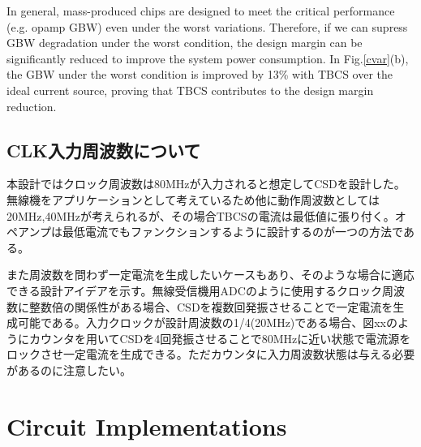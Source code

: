 \documentclass[letterpaper, 10 pt, conference]{ieeeconf}  %
\begin{document}
In general, mass-produced chips are designed to meet the critical performance (e.g. opamp GBW) even under the worst variations. Therefore, if we can supress GBW degradation under the worst condition, the design margin can be significantly reduced to improve the system power consumption. In Fig.\ref{cvar}(b), the GBW under the worst condition is improved by 13\% with TBCS over the ideal current source, proving that TBCS contributes to the design margin reduction.

\subsection{CLK入力周波数について}
本設計ではクロック周波数は80MHzが入力されると想定してCSDを設計した。無線機をアプリケーションとして考えているため他に動作周波数としては20MHz,40MHzが考えられるが、その場合TBCSの電流は最低値に張り付く。オペアンプは最低電流でもファンクションするように設計するのが一つの方法である。

また周波数を問わず一定電流を生成したいケースもあり、そのような場合に適応できる設計アイデアを示す。無線受信機用ADCのように使用するクロック周波数に整数倍の関係性がある場合、CSDを複数回発振させることで一定電流を生成可能である。入力クロックが設計周波数の1/4(20MHz)である場合、図xxのようにカウンタを用いてCSDを4回発振させることで80MHzに近い状態で電流源をロックさせ一定電流を生成できる。ただカウンタに入力周波数状態は与える必要があるのに注意したい。


\section{Circuit Implementations}
\end{document}
